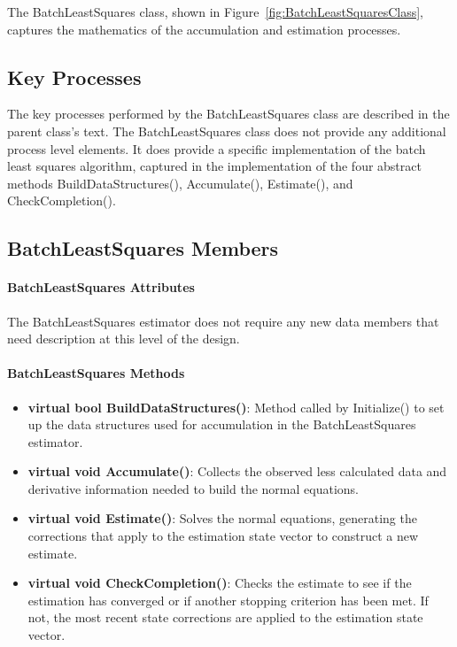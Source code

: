 The BatchLeastSquares class, shown in Figure~\ref{fig:BatchLeastSquaresClass}, captures the mathematics of the accumulation and estimation processes.

\subsection{Key Processes}

The key processes performed by the BatchLeastSquares class are described in the parent class's text.  The BatchLeastSquares class does not provide any additional process level elements.  It does provide a specific implementation of the batch least squares algorithm, captured in the implementation of the four  abstract methods BuildDataStructures(), Accumulate(), Estimate(), and CheckCompletion().

\subsection{BatchLeastSquares Members}

\paragraph{BatchLeastSquares Attributes}

The BatchLeastSquares estimator does not require any new data members that need description at this level of the design.

\paragraph{BatchLeastSquares Methods}

\begin{itemize}
\item \textbf{virtual bool BuildDataStructures()}:  Method called by Initialize() to set up the data structures used for accumulation in the BatchLeastSquares estimator.
\item \textbf{virtual void Accumulate()}:  Collects the observed less calculated data and derivative information needed to build the normal equations.
\item \textbf{virtual void Estimate()}:  Solves the normal equations, generating the corrections that apply to the estimation state vector to construct a new estimate.
\item \textbf{virtual void CheckCompletion()}:  Checks the estimate to see if the estimation has converged or if another stopping criterion has been met.  If not, the most recent state corrections are applied to the estimation state vector.
\end{itemize}

